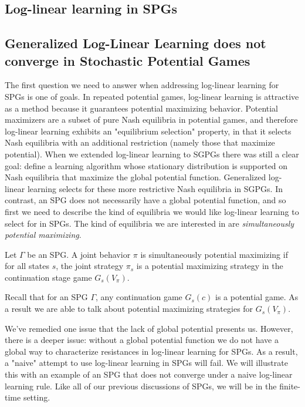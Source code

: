 \subsection{Log-linear learning in SPGs}

\subsection{Generalized Log-Linear Learning does not converge in Stochastic Potential Games}

The first question we need to answer when addressing log-linear learning for SPGs is one of goals. In repeated potential games, log-linear learning is attractive as a method because it guarantees potential maximizing behavior. Potential maximizers are a subset of pure Nash equilibria in potential games, and therefore log-linear learning exhibits an "equilibrium selection" property, in that it selects Nash equilibria with an additional restriction (namely those that maximize potential). When we extended log-linear learning to SGPGs there was still a clear goal: define a learning algorithm whose stationary distribution is supported on Nash equilibria that maximize the global potential function. Generalized log-linear learning selects for these more restrictive Nash equilibria in SGPGs. In contrast, an SPG does not necessarily have a global potential function, and so first we need to describe the kind of equilibria we would like log-linear learning to select for in SPGs. The kind of equilibria we are interested in are {\em simultaneously potential maximizing}.

\begin{mydef}
Let $\Gamma$ be an SPG. A joint behavior $\pi$ is simultaneously potential maximizing if for all states $s$, the joint strategy $\pi_s$ is a potential maximizing strategy in the continuation stage game $G_s(V_{\pi})$. 
\end{mydef}

Recall that for an SPG $\Gamma$, any continuation game $G_s(c)$ is a potential game. As a result we are able to talk about potential maximizing strategies for $G_s(V_{\pi})$. 


We've remedied one issue that the lack of global potential presents us. However, there is a deeper issue: without a global potential function we do not have a global way to characterize resistances in log-linear learning for SPGs. As a result, a "naive" attempt to use log-linear learning in SPGs will fail. We will illustrate this with an example of an SPG that does not converge under a naive log-linear learning rule. Like all of our previous discussions of SPGs, we will be in the finite-time setting.

